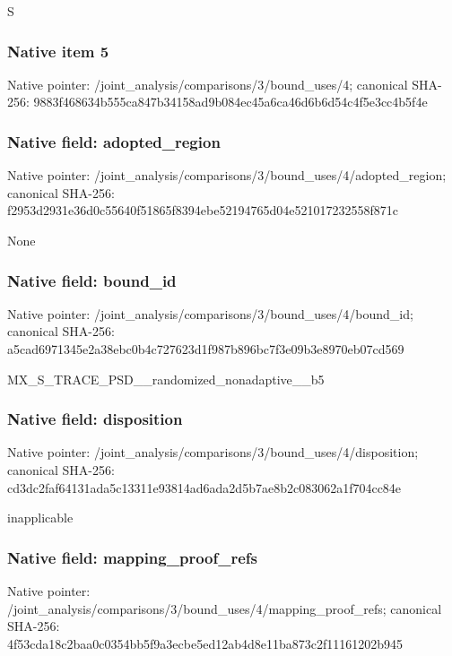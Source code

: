 \documentclass[10pt,a4paper]{article}
\begin{document}
\begingroup\raggedright\sloppy S\par\endgroup

\subsubsection{Native item 5}
Native pointer: /joint\_\allowbreak{}analysis/comparisons/3/bound\_\allowbreak{}uses/4; canonical SHA-256: 9883f468634b555ca847b34158ad9b084ec45a6ca46d6b6d54c4f5e3cc4b5f4e

\subsubsection{Native field: adopted\_\allowbreak{}region}
Native pointer: /joint\_\allowbreak{}analysis/comparisons/3/bound\_\allowbreak{}uses/4/adopted\_\allowbreak{}region; canonical SHA-256: f2953d2931e36d0c55640f51865f8394ebe52194765d04e521017232558f871c

\begingroup\raggedright\sloppy None\par\endgroup

\subsubsection{Native field: bound\_\allowbreak{}id}
Native pointer: /joint\_\allowbreak{}analysis/comparisons/3/bound\_\allowbreak{}uses/4/bound\_\allowbreak{}id; canonical SHA-256: a5cad6971345e2a38ebc0b4c727623d1f987b896bc7f3e09b3e8970eb07cd569

\begingroup\raggedright\sloppy MX\_\allowbreak{}S\_\allowbreak{}TRACE\_\allowbreak{}PSD\_\allowbreak{}\_\allowbreak{}randomized\_\allowbreak{}nonadaptive\_\allowbreak{}\_\allowbreak{}b5\par\endgroup

\subsubsection{Native field: disposition}
Native pointer: /joint\_\allowbreak{}analysis/comparisons/3/bound\_\allowbreak{}uses/4/disposition; canonical SHA-256: cd3dc2faf64131ada5c13311e93814ad6ada2d5b7ae8b2c083062a1f704cc84e

\begingroup\raggedright\sloppy inapplicable\par\endgroup

\subsubsection{Native field: mapping\_\allowbreak{}proof\_\allowbreak{}refs}
Native pointer: /joint\_\allowbreak{}analysis/comparisons/3/bound\_\allowbreak{}uses/4/mapping\_\allowbreak{}proof\_\allowbreak{}refs; canonical SHA-256: 4f53cda18c2baa0c0354bb5f9a3ecbe5ed12ab4d8e11ba873c2f11161202b945
\end{document}
